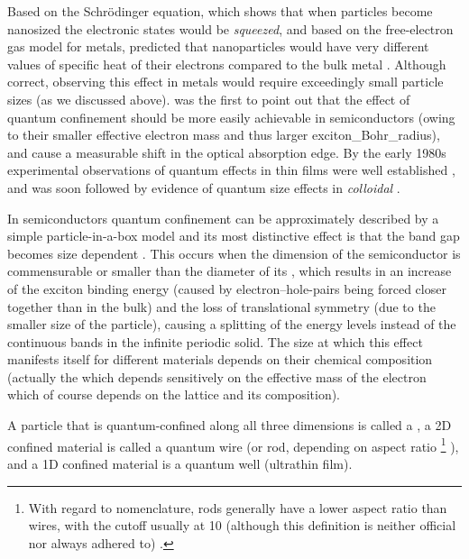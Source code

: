 \documentclass[draft,webedition,openright,titles,swedish,english]{LuaUUThesis}\usepackage[]{graphicx}\usepackage[]{xcolor}
\begin{document}
Based on the Schrödinger equation, which shows that when particles become nanosized
the electronic states would be \emph{squeezed}, and based on the free-electron gas model
for metals, \textcite{Frohlich1937} predicted that nanoparticles would have very
different values of specific heat of their electrons compared to the bulk metal \cite{Linke2023}.
Although correct, observing this effect in metals would require exceedingly small
particle sizes (as we discussed above).
\textcite{Sandomirskii1963} was the first to point out that the effect of
quantum confinement should be more easily achievable in semiconductors (owing
to their smaller effective electron mass and thus larger \gls{exciton_Bohr_radius}),
and cause a measurable shift in the optical absorption edge.
By the early 1980s experimental observations of quantum effects in thin films
were well established \cite{Linke2023}, and was soon followed by evidence of
quantum size effects in \emph{colloidal}  \cite{Brus1984a}.

In semiconductors quantum confinement can be approximately described by
a simple particle-in-a-box model and its most distinctive effect is that
the band gap becomes size dependent \cite{Law2004}.
This occurs when the dimension of the semiconductor is commensurable
or smaller than the diameter of its , which results
in an increase of the exciton binding energy (caused by electron--hole-pairs
being forced closer together than in the bulk) \cite{Jimenez2016}
and the loss of translational symmetry (due to the smaller size of the particle),
causing a splitting of the energy levels instead of the continuous bands
in the infinite periodic solid.
The size at which this effect manifests itself for different materials depends
on their chemical composition
(actually the  which depends sensitively on
the effective mass of the electron which of course depends on the lattice
and its composition).

A particle that is quantum-confined along all three dimensions is called
a , a 2D confined material is called a quantum wire
(or rod, depending on aspect ratio%
\footnote{%
   With regard to nomenclature, rods generally have a lower aspect ratio
   than wires, with the cutoff usually at \num{10} (although this definition
   is neither official nor always adhered to) \cite{Jeevanandam2018}.}%
), and a 1D confined material is a quantum well (ultrathin film).
\end{document}
